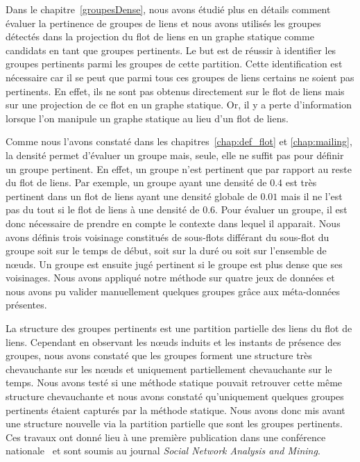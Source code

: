 \bigskip
Dans le chapitre~\ref{groupesDense}, nous avons étudié plus en détails comment évaluer la pertinence de groupes de liens et nous avons utilisés les groupes détectés dans la projection du flot de liens en un graphe statique comme candidats en tant que groupes pertinents.
Le but est de réussir à identifier les groupes pertinents parmi les groupes de cette partition.
Cette identification est nécessaire car il se peut que parmi tous ces groupes de liens certains ne soient pas pertinents.
En effet, ils ne sont pas obtenus directement sur le flot de liens mais sur une projection de ce flot en un graphe statique.
Or, il y a perte d'information lorsque l'on manipule un graphe statique au lieu d'un flot de liens.

Comme nous l'avons constaté dans les chapitres~\ref{chap:def_flot} et \ref{chap:mailing}, la densité permet d'évaluer un groupe mais, seule, elle ne suffit pas pour définir un groupe pertinent.
En effet, un groupe n'est pertinent que par rapport au reste du flot de liens.
Par exemple, un groupe ayant une densité de $0.4$ est très pertinent dans un flot de liens ayant une densité globale de $0.01$ mais il ne l'est pas du tout si le flot de liens à une densité de $0.6$.
Pour évaluer un groupe, il est donc nécessaire de prendre en compte le contexte dans lequel il apparait.
Nous avons définis trois voisinage constitués de sous-flots différant du sous-flot du groupe soit sur le temps de début, soit sur la duré ou soit sur l'ensemble de n\oe uds.
Un groupe est ensuite jugé pertinent si le groupe est plus dense que ses voisinages.
Nous avons appliqué notre méthode sur quatre jeux de données et nous avons pu valider manuellement quelques groupes grâce aux méta-données présentes.

La structure des groupes pertinents est une partition partielle des liens du flot de liens.
Cependant en observant les n\oe uds induits et les instants de présence des groupes, nous avons constaté que les groupes forment une structure très chevauchante sur les n\oe uds et uniquement partiellement chevauchante sur le temps.
Nous avons testé si une méthode statique pouvait retrouver cette même structure chevauchante et nous avons constaté qu'uniquement quelques groupes pertinents étaient capturés par la méthode statique.
Nous avons donc mis avant une structure nouvelle via la partition partielle que sont les groupes pertinents.
Ces travaux ont donné lieu à une première publication dans une conférence nationale~\cite{gaumont:hal-01305118} et sont soumis au journal \emph{Social Network Analysis and Mining}.


